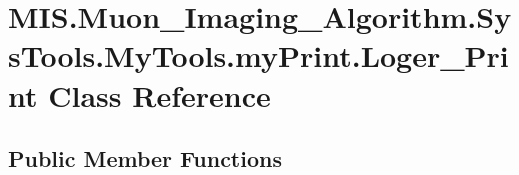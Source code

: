 \hypertarget{classMIS_1_1Muon__Imaging__Algorithm_1_1SysTools_1_1MyTools_1_1myPrint_1_1Loger__Print}{}\section{M\+I\+S.\+Muon\+\_\+\+Imaging\+\_\+\+Algorithm.\+Sys\+Tools.\+My\+Tools.\+my\+Print.\+Loger\+\_\+\+Print Class Reference}
\label{classMIS_1_1Muon__Imaging__Algorithm_1_1SysTools_1_1MyTools_1_1myPrint_1_1Loger__Print}
\subsection*{Public Member Functions}
